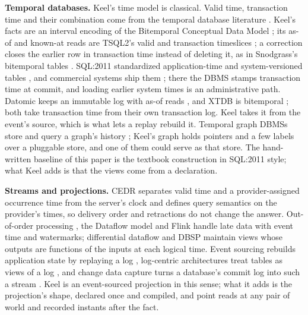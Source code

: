 \documentclass[sigconf, nonacm]{acmart}
\begin{document}
\textbf{Temporal databases.} Keel's time model is classical. Valid time, transaction time and their combination come from the temporal database literature \cite{jensen-glossary}. Keel's facts are an interval encoding of the Bitemporal Conceptual Data Model \cite{jensen-bcdm}; its as-of and known-at reads are TSQL2's valid and transaction timeslices \cite{snodgrass-tsql2}; a correction closes the earlier row in transaction time instead of deleting it, as in Snodgrass's bitemporal tables \cite{snodgrass-book}. SQL:2011 standardized application-time and system-versioned tables \cite{kulkarni-sql2011}, and commercial systems ship them \cite{sqlserver-temporal,mariadb-sysver}; there the DBMS stamps transaction time at commit, and loading earlier system times is an administrative path. Datomic keeps an immutable log with as-of reads \cite{datomic}, and XTDB is bitemporal \cite{xtdb}; both take transaction time from their own transaction log. Keel takes it from the event's source, which is what lets a replay rebuild it. Temporal graph DBMSs store and query a graph's history \cite{aeong,clockg,tgql}; Keel's graph holds pointers and a few labels over a pluggable store, and one of them could serve as that store. The hand-written baseline of this paper is the textbook construction in SQL:2011 style; what Keel adds is that the views come from a declaration.

\textbf{Streams and projections.} CEDR \cite{cedr} separates valid time and a provider-assigned occurrence time from the server's clock and defines query semantics on the provider's times, so delivery order and retractions do not change the answer. Out-of-order processing \cite{li-ooo}, the Dataflow model \cite{akidau-dataflow} and Flink \cite{carbone-flink} handle late data with event time and watermarks; differential dataflow \cite{mcsherry-dd} and DBSP \cite{budiu-dbsp} maintain views whose outputs are functions of the inputs at each logical time. Event sourcing rebuilds application state by replaying a log \cite{fowler-es}, log-centric architectures treat tables as views of a log \cite{kreps-log,kleppmann-insideout,kleppmann-olep}, and change data capture turns a database's commit log into such a stream \cite{debezium}. Keel is an event-sourced projection in this sense; what it adds is the projection's shape, declared once and compiled, and point reads at any pair of world and recorded instants after the fact.
\end{document}
